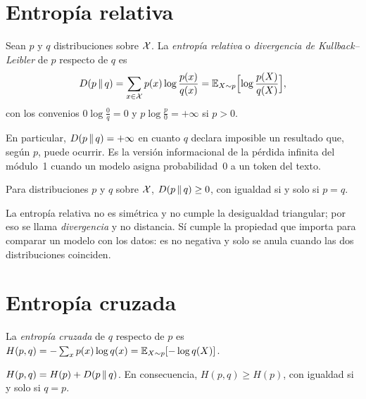 \section{Entropía relativa}

\begin{definicion}\label{def:kl}
Sean $p$ y $q$ distribuciones sobre $\mathcal{X}$. La \emph{entropía relativa} o \emph{divergencia de Kullback--Leibler} de $p$ respecto de $q$ es
\[
D(p\,\|\,q)=\sum_{x\in\mathcal{X}}p(x)\log\frac{p(x)}{q(x)}=\mathbb{E}_{X\sim p}\Bigl[\log\frac{p(X)}{q(X)}\Bigr],
\]
con los convenios $0\log\frac{0}{q}=0$ y $p\log\frac{p}{0}=+\infty$ si $p>0$.
\end{definicion}

En particular, $D(p\,\|\,q)=+\infty$ en cuanto $q$ declara imposible un resultado que, según $p$, puede ocurrir. Es la versión informacional de la pérdida infinita del módulo~1 cuando un modelo asigna probabilidad~0 a un token del texto.

\begin{teorema}\label{teo:gibbs}
Para distribuciones $p$ y $q$ sobre $\mathcal{X}$, $D(p\,\|\,q)\ge 0$, con igualdad si y solo si $p=q$.
\end{teorema}

\addtocounter{definicion}{1}%

\begin{observacion}
La entropía relativa no es simétrica y no cumple la desigualdad triangular; por eso se llama \emph{divergencia} y no distancia. Sí cumple la propiedad que importa para comparar un modelo con los datos: es no negativa y solo se anula cuando las dos distribuciones coinciden.
\end{observacion}

\section{Entropía cruzada}

\begin{definicion}\label{def:cruzada}
La \emph{entropía cruzada} de $q$ respecto de $p$ es $H(p,q)=-\sum_{x}p(x)\log q(x)=\mathbb{E}_{X\sim p}[-\log q(X)]$.
\end{definicion}

\begin{proposicion}\label{prop:descomposicion}
$H(p,q)=H(p)+D(p\,\|\,q)$. En consecuencia, $H(p,q)\ge H(p)$, con igualdad si y solo si $q=p$.
\end{proposicion}

